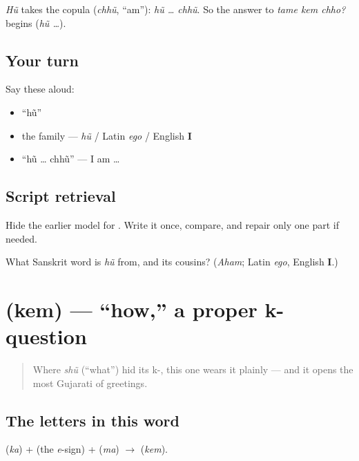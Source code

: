\begin{grammarlens}[title={Grammar Lens: \textquotedblleft{}I\textquotedblright{} plus the copula}]
\emph{Hũ} takes the copula \textbf{} (\emph{chhũ}, \textquotedblleft{}am\textquotedblright{}): \emph{hũ … chhũ}. So the answer to \emph{tame kem chho?} begins \textbf{} (\emph{hũ …}).
\end{grammarlens}

\subsection*{Your turn}
Say these aloud:

\begin{itemize}
\raggedright
  \item \textquotedblleft{}hũ\textquotedblright{}
  \item the family — \emph{hũ} / Latin \emph{ego} / English \textbf{I}
  \item \textquotedblleft{}hũ … chhũ\textquotedblright{} — I am …
\end{itemize}

\subsection*{Script retrieval}
Hide the earlier model for \textbf{}. Write it once, compare, and repair only one part if needed.

\begin{tcolorbox}[breakable,colback=teal!4,colframe=teal!35!black,title={Before you move on}]
What Sanskrit word is \emph{hũ} from, and its cousins? (\emph{Aham}; Latin \emph{ego}, English \textbf{I}.)
\end{tcolorbox}
\section[\texorpdfstring{\gu{કેમ} (kem)}{કેમ (kem)}]{ (kem) — \textquotedblleft{}how,\textquotedblright{} a proper k- question}

\label{lesson:GU-C03-kem}



\begin{quote}
Where \emph{shũ} (\textquotedblleft{}what\textquotedblright{}) hid its k-, this one wears it plainly — and it opens the most Gujarati of greetings.
\end{quote}

\subsection*{The letters in this word}
\textbf{} (\emph{ka}) + \textbf{} (the \emph{e}-sign) + \textbf{} (\emph{ma}) $\to$ \textbf{} (\emph{kem}).

